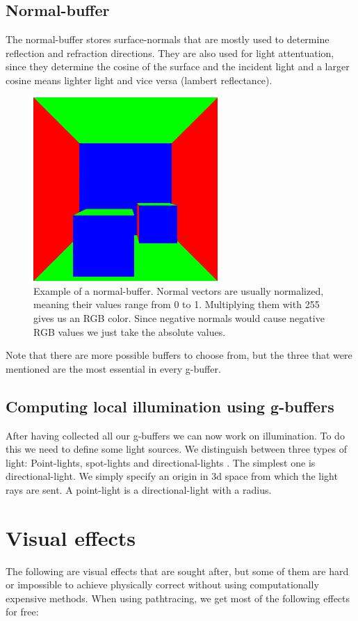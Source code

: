 \documentclass{ACGSeminar}
\begin{document}
	\subsection{Normal-buffer}
		The normal-buffer stores surface-normals that are mostly used to determine reflection and refraction directions. They are also used for light attentuation, since they determine the cosine of the surface and the incident light and a larger cosine means lighter light and vice versa (lambert reflectance).
		\begin{figure}[htb!]%
			\begin{center}%
				\includegraphics[width=7cm]{img/normal_buffer.png}
			\end{center}%
			\caption{Example of a normal-buffer. Normal vectors are usually normalized, meaning their values range from 0 to 1. Multiplying them with 255 gives us an RGB color. Since negative normals
			would cause negative RGB values we just take the absolute values.}%
			\label{fig:normal_buffer}%
		\end{figure}%
		Note that there are more possible buffers to choose from, but the three that were mentioned are the most essential in every g-buffer.
	\subsection{Computing local illumination using g-buffers}
		After having collected all our g-buffers we can now work on illumination. To do this we need to define some light sources. We distinguish between three types of light:
		Point-lights, spot-lights and directional-lights \cite{DST}. The simplest one is directional-light. We simply specify an origin in 3d space from which the light rays are sent. A point-light is a directional-light with a radius. %

\section{Visual effects}
	The following are visual effects that are sought after, but some of them are hard or impossible to achieve physically correct without using
	computationally expensive methods. When using pathtracing, we get most of the following effects for free: 
\end{document}
